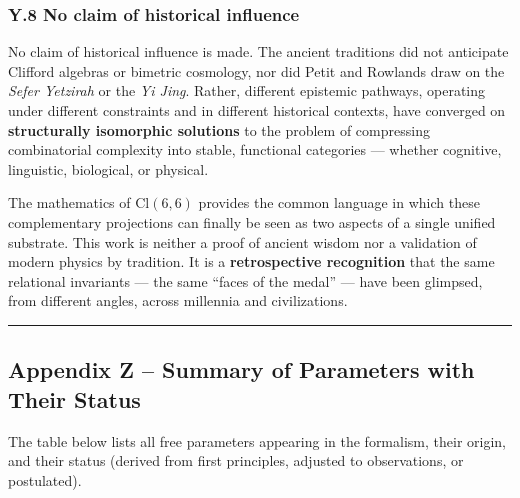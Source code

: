 \documentclass[11pt]{article}
\begin{document}
\hypertarget{y.8-no-claim-of-historical-influence}{%
\subsubsection{Y.8 No claim of historical
influence}\label{y.8-no-claim-of-historical-influence}}

No claim of historical influence is made. The ancient traditions did not
anticipate Clifford algebras or bimetric cosmology, nor did Petit and
Rowlands draw on the \emph{Sefer Yetzirah} or the \emph{Yi Jing}.
Rather, different epistemic pathways, operating under different
constraints and in different historical contexts, have converged on
\textbf{structurally isomorphic solutions} to the problem of compressing
combinatorial complexity into stable, functional categories --- whether
cognitive, linguistic, biological, or physical.

The mathematics of \(\mathrm{Cl}(6,6)\) provides the common language in
which these complementary projections can finally be seen as two aspects
of a single unified substrate. This work is neither a proof of ancient
wisdom nor a validation of modern physics by tradition. It is a
\textbf{retrospective recognition} that the same relational invariants
--- the same ``faces of the medal'' --- have been glimpsed, from
different angles, across millennia and civilizations.

\begin{center}\rule{0.5\linewidth}{0.5pt}\end{center}

\hypertarget{appendix-z-summary-of-parameters-with-their-status}{%
\subsection{Appendix Z -- Summary of Parameters with Their
Status}\label{appendix-z-summary-of-parameters-with-their-status}}

The table below lists all free parameters appearing in the formalism,
their origin, and their status (derived from first principles, adjusted
to observations, or postulated).
\end{document}
